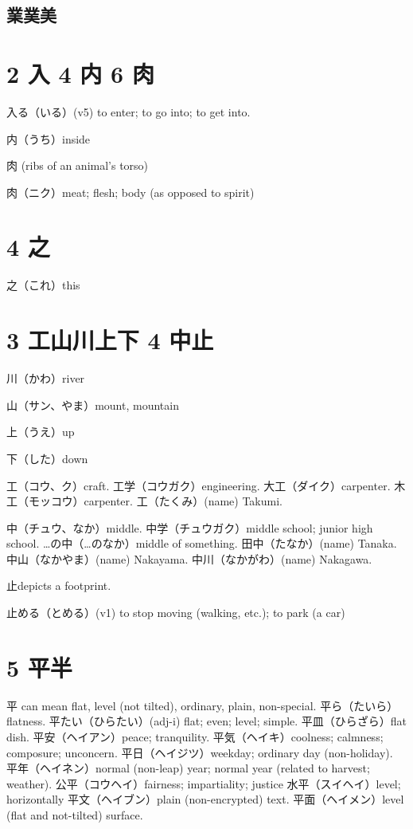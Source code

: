 \subsection{業菐美}

\section{2 入 4 内 6 肉}

入る（いる）(v5)
to enter; to go into; to get into.

内（うち）inside

肉 (ribs of an animal's torso)

肉（ニク）meat; flesh; body (as opposed to spirit)

\section{4 之}

之（これ）this

\section{3 工山川上下 4 中止}

川（かわ）river

山（サン、やま）mount, mountain

上（うえ）up

下（した）down

工（コウ、ク）craft.
工学（コウガク）engineering.
大工（ダイク）carpenter.
木工（モッコウ）carpenter.
工（たくみ）(name) Takumi.

中（チュウ、なか）middle.
中学（チュウガク）middle school; junior high school.
…の中（…のなか）middle of something.
田中（たなか）(name) Tanaka.
中山（なかやま）(name) Nakayama.
中川（なかがわ）(name) Nakagawa.

止depicts a footprint.

止める（とめる）(v1) to stop moving (walking, etc.); to park (a car)

\section{5 平半}

平 can mean flat, level (not tilted), ordinary, plain, non-special.
平ら（たいら）flatness.
平たい（ひらたい）(adj-i) flat; even; level; simple.
平皿（ひらざら）flat dish.
平安（ヘイアン）peace; tranquility.
平気（ヘイキ）coolness; calmness; composure; unconcern.
平日（ヘイジツ）weekday; ordinary day (non-holiday).
平年（ヘイネン）normal (non-leap) year; normal year (related to harvest; weather).
公平（コウヘイ）fairness; impartiality; justice
水平（スイヘイ）level; horizontally
平文（ヘイブン）plain (non-encrypted) text.
平面（ヘイメン）level (flat and not-tilted) surface.

